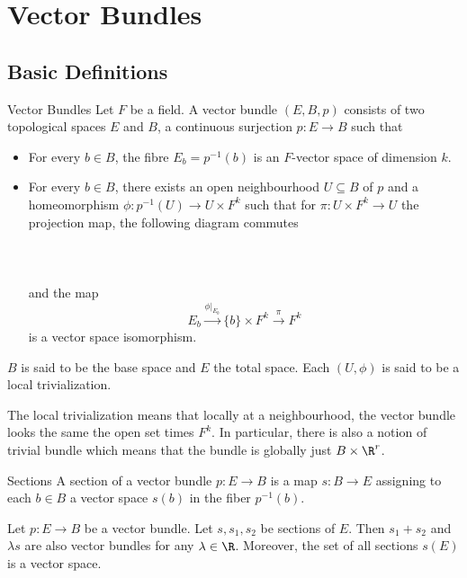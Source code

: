 \documentclass[a4paper]{article}
\begin{document}
\pagebreak
\section{Vector Bundles}
\subsection{Basic Definitions}
\begin{defn}{Vector Bundles}{} Let $F$ be a field. A vector bundle $(E,B,p)$ consists of two topological spaces $E$ and $B$, a continuous surjection $p:E\to B$ such that
\begin{itemize}
\item For every $b\in B$, the fibre $E_b=p^{-1}(b)$ is an $F$-vector space of dimension $k$. 
\item For every $b\in B$, there exists an open neighbourhood $U\subseteq B$ of $p$ and a homeomorphism $\phi:p^{-1}(U)\to U\times F^k$ such that for $\pi:U\times F^k\to U$ the projection map, the following diagram commutes \\~\\
 \\~\\
and the map $$E_b\overset{\phi|_{E_b}}{\longrightarrow}\{b\}\times F^k\overset{\pi}{\longrightarrow}F^k$$ is a vector space isomorphism. 
\end{itemize}
$B$ is said to be the base space and $E$ the total space. Each $(U,\phi)$ is said to be a local trivialization. 
\end{defn}

The local trivialization means that locally at a neighbourhood, the vector bundle looks the same the open set times $F^k$. In particular, there is also a notion of trivial bundle which means that the bundle is globally just $B\times\R^r$. 

\begin{defn}{Sections}{} A section of a vector bundle $p:E\to B$ is a map $s:B\to E$ assigning to each $b\in B$ a vector space $s(b)$ in the fiber $p^{-1}(b)$. 
\end{defn}

\begin{prp}{}{} Let $p:E\to B$ be a vector bundle. Let $s,s_1,s_2$ be sections of $E$. Then $s_1+s_2$ and $\lambda s$ are also vector bundles for any $\lambda\in\R$. Moreover, the set of all sections $s(E)$ is a vector space. 
\end{prp}
\end{document}
